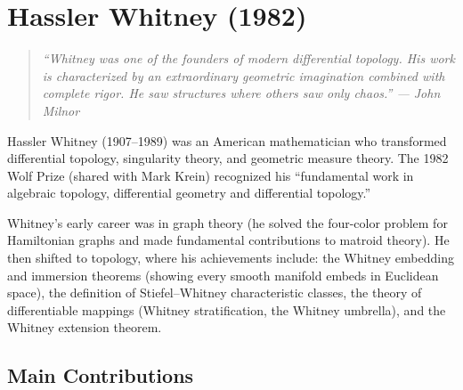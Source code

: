 \let\im\relax
\newcommand{\im}{\operatorname{im}}
\let\Sing\relax
\newcommand{\Sing}{\operatorname{Sing}}
\let\Ker\relax
\newcommand{\Ker}{\operatorname{Ker}}
\let\Coker\relax
\newcommand{\Coker}{\operatorname{Coker}}
\let\Gr\relax
\newcommand{\Gr}{\operatorname{Gr}}
\let\N\relax
\newcommand{\N}{\mathbb{N}}
\let\R\relax
\newcommand{\R}{\mathbb{R}}
\let\C\relax
\newcommand{\C}{\mathbb{C}}
\let\Q\relax
\newcommand{\Q}{\mathbb{Q}}
\let\Z\relax
\newcommand{\Z}{\mathbb{Z}}
\let\cU\relax
\newcommand{\cU}{\mathcal{U}}

\chapter{Hassler Whitney (1982)}

\begin{quote}
\it ``Whitney was one of the founders of modern differential topology. His work is characterized by an extraordinary geometric imagination combined with complete rigor. He saw structures where others saw only chaos.'' --- John Milnor
\end{quote}

Hassler Whitney (1907--1989) was an American mathematician who transformed differential topology, singularity theory, and geometric measure theory. The 1982 Wolf Prize (shared with Mark Krein) recognized his ``fundamental work in algebraic topology, differential geometry and differential topology.''

Whitney's early career was in graph theory (he solved the four-color problem for Hamiltonian graphs and made fundamental contributions to matroid theory). He then shifted to topology, where his achievements include: the Whitney embedding and immersion theorems (showing every smooth manifold embeds in Euclidean space), the definition of Stiefel--Whitney characteristic classes, the theory of differentiable mappings (Whitney stratification, the Whitney umbrella), and the Whitney extension theorem.

\section{Main Contributions}

